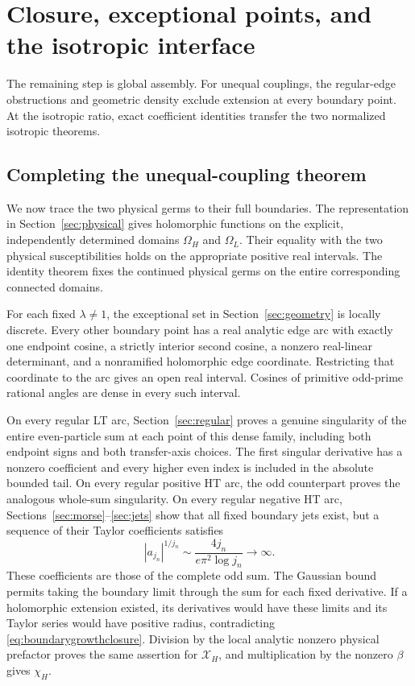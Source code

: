 \documentclass[11pt]{article}
\numberwithin{equation}{section}
\theoremstyle{definition}
\newcommand{\OH}{\Omega_H}
\newcommand{\OL}{\Omega_L}
\newcommand{\XH}{\mathcal X_H}
\begin{document}
\section{Closure, exceptional points, and the isotropic interface}\label{sec:closure}

The remaining step is global assembly. For unequal couplings, the
regular-edge obstructions and geometric density exclude extension at
every boundary point. At the isotropic ratio, exact coefficient
identities transfer the two normalized isotropic theorems.

\subsection{Completing the unequal-coupling theorem}
We now trace the two physical germs to their full boundaries. The
representation in Section~\ref{sec:physical} gives holomorphic functions
on the explicit, independently determined domains $\OH$ and $\OL$.
Their equality with the two physical susceptibilities holds on the
appropriate positive real intervals. The identity theorem fixes the
continued physical germs on the entire corresponding connected domains.

For each fixed $\lambda\ne1$, the exceptional set in
Section~\ref{sec:geometry} is locally discrete. Every other boundary
point has a real analytic edge arc with exactly one endpoint cosine,
a strictly interior second cosine, a nonzero real-linear determinant,
and a nonramified holomorphic edge coordinate. Restricting that
coordinate to the arc gives an open real interval. Cosines of primitive
odd-prime rational angles are dense in every such interval.

On every regular LT arc, Section~\ref{sec:regular} proves a genuine
singularity of the entire even-particle sum at each point of this dense
family, including both endpoint signs and both transfer-axis choices.
The first singular derivative has a nonzero coefficient and every
higher even index is included in the absolute bounded tail. On every
regular positive HT arc, the odd counterpart proves the analogous
whole-sum singularity. On every regular negative HT arc,
Sections~\ref{sec:morse}--\ref{sec:jets} show that all fixed boundary
jets exist, but a sequence of their Taylor coefficients satisfies
\begin{equation}\label{eq:boundarygrowthclosure}
 |a_{j_n}|^{1/j_n}\sim\frac{4j_n}{e\pi^2\log j_n}\longrightarrow\infty.
\end{equation}
These coefficients are those of the complete odd sum. The Gaussian
bound permits taking the boundary limit through the sum for each fixed
derivative. If a holomorphic extension existed, its derivatives would
have these limits and its Taylor series would have positive radius,
contradicting \eqref{eq:boundarygrowthclosure}. Division by the local
analytic nonzero physical prefactor proves the same assertion for
$\XH$, and multiplication by the nonzero $\beta$ gives $\chi_H$.
\end{document}
